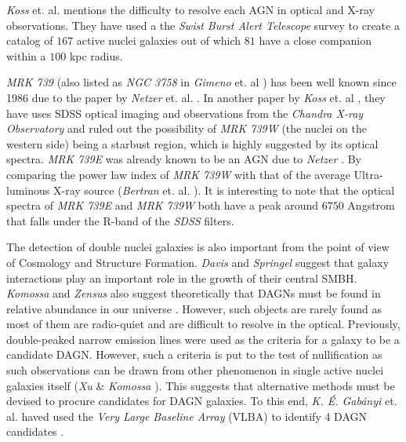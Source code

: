 \documentclass[12pt]{article}
\begin{document}
\bigskip

\textit{Koss} et. al. \cite{koss_bat} mentions the difficulty to resolve each AGN in optical and X-ray observations. They have used a the \textit{Swist Burst Alert Telescope} survey to create a catalog of $167$ active nuclei galaxies out of which $81$ have a close companion within a $100$ kpc radius. 

\bigskip

\textit{MRK 739} (also listed as \textit{NGC 3758} in \textit{Gimeno} et. al \cite{gimeno}) has been well known since 1986 due to the paper by \textit{Netzer} et. al. \cite{netzer}. In another paper by \textit{Koss} et. al \cite{koss_mrk739}, they have uses SDSS optical imaging and observations from the \textit{Chandra X-ray Observatory} and ruled out the possibility of \textit{MRK 739W} (the nuclei on the western side) being a starbust region, which is highly suggested by its optical spectra. \textit{MRK 739E} was already known to be an AGN due to \textit{Netzer} \cite{netzer}. By comparing the power law index of \textit{MRK 739W} with that of the average Ultra-luminous X-ray source (\textit{Bertran} et. al. \cite{bertram}). It is interesting to note that the optical spectra of \textit{MRK 739E} and \textit{MRK 739W} both have a peak around $6750$ Angstrom that falls under the R-band of the \textit{SDSS} filters.

\bigskip

The detection of double nuclei galaxies is also important from the point of view of Cosmology and Structure Formation. \textit{Davis} \cite{davis} and \textit{Springel} \cite{springel} suggest that galaxy interactions play an important role in the growth of their central SMBH. \textit{Komossa} and \textit{Zensus} also suggest theoretically that DAGNs must be found in relative abundance in our universe \cite{komossa_zensus}. However, such objects are rarely found as most of them are radio-quiet and are difficult to resolve in the optical. Previously, double-peaked narrow emission lines were used as the criteria for a galaxy to be a candidate DAGN. However, such a criteria is put to the test of nullification as such observations can be drawn from other phenomenon in single active nuclei galaxies itself (\textit{Xu} & \textit{Komossa} \cite{xu_komossa}). This suggests that alternative methods must be devised to procure candidates for DAGN galaxies. To this end, \textit{K. É. Gabányi} et. al. haved used the \textit{Very Large Baseline Array} (VLBA) to identify 4 DAGN candidates \cite{ke_gabanyi}. 
\end{document}
